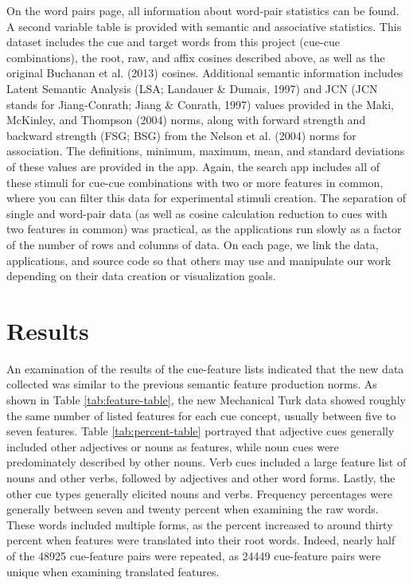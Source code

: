 \documentclass[english,,man]{apa6}
\theoremstyle{definition}
\theoremstyle{definition}
\theoremstyle{definition}
\theoremstyle{remark}
\begin{document}
On the word pairs page, all information about word-pair statistics can
be found. A second variable table is provided with semantic and
associative statistics. This dataset includes the cue and target words
from this project (cue-cue combinations), the root, raw, and affix
cosines described above, as well as the original Buchanan et al. (2013)
cosines. Additional semantic information includes Latent Semantic
Analysis (LSA; Landauer \& Dumais, 1997) and JCN (JCN stands for
Jiang-Conrath; Jiang \& Conrath, 1997) values provided in the Maki,
McKinley, and Thompson (2004) norms, along with forward strength and
backward strength (FSG; BSG) from the Nelson et al. (2004) norms for
association. The definitions, minimum, maximum, mean, and standard
deviations of these values are provided in the app. Again, the search
app includes all of these stimuli for cue-cue combinations with two or
more features in common, where you can filter this data for experimental
stimuli creation. The separation of single and word-pair data (as well
as cosine calculation reduction to cues with two features in common) was
practical, as the applications run slowly as a factor of the number of
rows and columns of data. On each page, we link the data, applications,
and source code so that others may use and manipulate our work depending
on their data creation or visualization goals.

\hypertarget{results}{%
\section{Results}\label{results}}

An examination of the results of the cue-feature lists indicated that
the new data collected was similar to the previous semantic feature
production norms. As shown in Table \ref{tab:feature-table}, the new
Mechanical Turk data showed roughly the same number of listed features
for each cue concept, usually between five to seven features. Table
\ref{tab:percent-table} portrayed that adjective cues generally included
other adjectives or nouns as features, while noun cues were
predominately described by other nouns. Verb cues included a large
feature list of nouns and other verbs, followed by adjectives and other
word forms. Lastly, the other cue types generally elicited nouns and
verbs. Frequency percentages were generally between seven and twenty
percent when examining the raw words. These words included multiple
forms, as the percent increased to around thirty percent when features
were translated into their root words. Indeed, nearly half of the 48925
cue-feature pairs were repeated, as 24449 cue-feature pairs were unique
when examining translated features.
\end{document}
